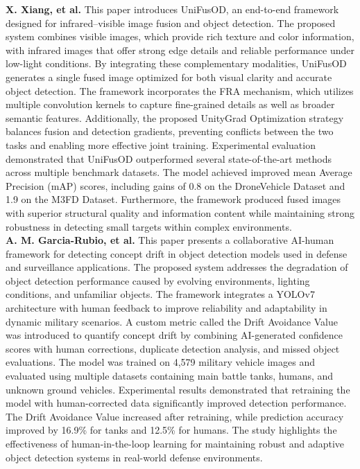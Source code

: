 \textbf{X. Xiang, et al.} This paper introduces UniFusOD, an end-to-end framework designed for infrared–visible image fusion and object detection. The proposed system combines visible images, which provide rich texture and color information, with infrared images that offer strong edge details and reliable performance under low-light conditions. By integrating these complementary modalities, UniFusOD generates a single fused image optimized for both visual clarity and accurate object detection. The framework incorporates the FRA mechanism, which utilizes multiple convolution kernels to capture fine-grained details as well as broader semantic features. Additionally, the proposed UnityGrad Optimization strategy balances fusion and detection gradients, preventing conflicts between the two tasks and enabling more effective joint training. Experimental evaluation demonstrated that UniFusOD outperformed several state-of-the-art methods across multiple benchmark datasets. The model achieved improved mean Average Precision (mAP) scores, including gains of 0.8 on the DroneVehicle Dataset and 1.9 on the M3FD Dataset. Furthermore, the framework produced fused images with superior structural quality and information content while maintaining strong robustness in detecting small targets within complex environments. \cite{supplementary_paper_6} \\

\textbf{A. M. Garcia-Rubio, et al.} This paper presents a collaborative AI-human framework for detecting concept drift in object detection models used in defense and surveillance applications. The proposed system addresses the degradation of object detection performance caused by evolving environments, lighting conditions, and unfamiliar objects. The framework integrates a YOLOv7 architecture with human feedback to improve reliability and adaptability in dynamic military scenarios. A custom metric called the Drift Avoidance Value was introduced to quantify concept drift by combining AI-generated confidence scores with human corrections, duplicate detection analysis, and missed object evaluations. The model was trained on 4,579 military vehicle images and evaluated using multiple datasets containing main battle tanks, humans, and unknown ground vehicles. Experimental results demonstrated that retraining the model with human-corrected data significantly improved detection performance. The Drift Avoidance Value increased after retraining, while prediction accuracy improved by 16.9\% for tanks and 12.5\% for humans. The study highlights the effectiveness of human-in-the-loop learning for maintaining robust and adaptive object detection systems in real-world defense environments. \cite{supplementary_paper_7} \\


